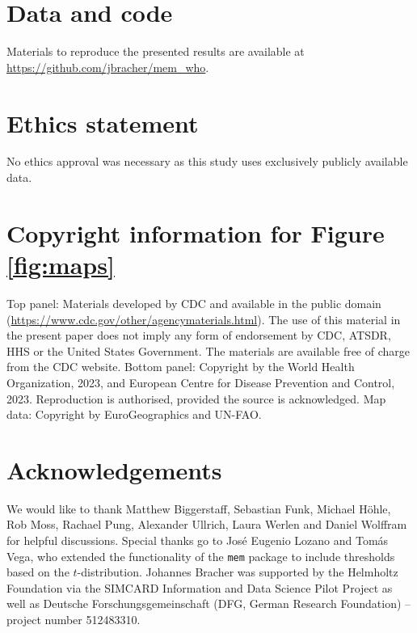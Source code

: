 \documentclass[12pt]{article}
\begin{document}

\section*{Data and code}

Materials to reproduce the presented results are available at \url{https://github.com/jbracher/mem_who}.

\section*{Ethics statement}

No ethics approval was necessary as this study uses exclusively publicly available data.

\section*{Copyright information for Figure \ref{fig:maps}}

Top panel: Materials developed by CDC and available in the public domain (\url{https://www.cdc.gov/other/agencymaterials.html}). The use of this material in the present paper does not imply any form of endorsement by CDC, ATSDR, HHS or the United States Government. The materials are available free of charge from the CDC website. Bottom panel: Copyright by the World Health Organization, 2023, and European Centre for Disease Prevention and Control, 2023. Reproduction is authorised, provided the source is acknowledged. Map data: Copyright by EuroGeographics and UN-FAO. 




\section*{Acknowledgements}

We would like to thank Matthew Biggerstaff, Sebastian Funk, Michael H\"ohle, Rob Moss, Rachael Pung, Alexander Ullrich, Laura Werlen and Daniel Wolffram for helpful discussions. Special thanks go to Jos\'e Eugenio Lozano and Tom\'as Vega, who extended the functionality of the \texttt{mem} package to include thresholds based on the $t$-distribution. Johannes Bracher was supported by the Helmholtz Foundation via the SIMCARD Information and Data Science Pilot Project as well as Deutsche Forschungsgemeinschaft (DFG, German Research Foundation) -- project number 512483310.
\end{document}
